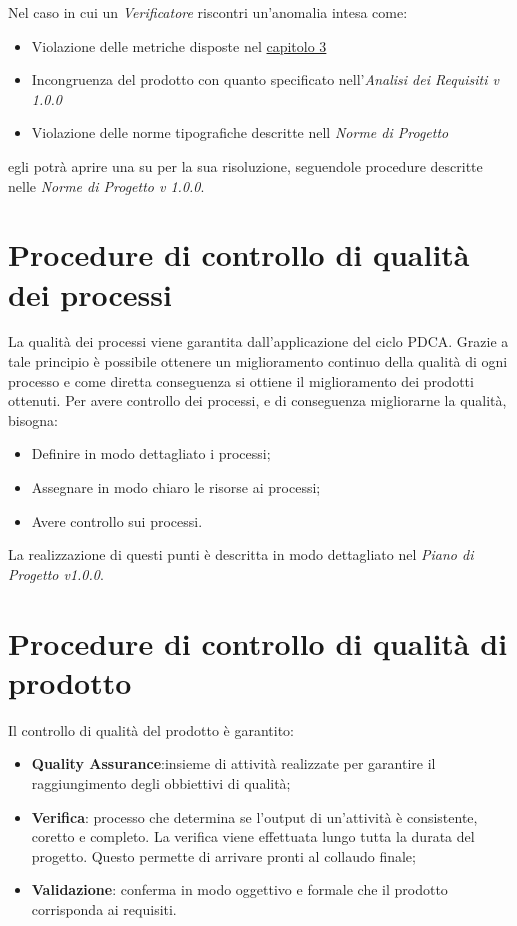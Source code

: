 Nel caso in cui un \textit{Verificatore} riscontri un'anomalia intesa come:

\begin{itemize}
	\item Violazione delle metriche disposte nel \hyperref[Metriche]{capitolo 3}
	\item Incongruenza del prodotto con quanto specificato nell'\textit{Analisi dei Requisiti v 1.0.0}
	\item Violazione delle norme tipografiche descritte nell \textit{Norme di Progetto}
\end{itemize}

egli potrà aprire una  su  per la sua risoluzione, seguendole procedure descritte nelle \textit{Norme di Progetto v 1.0.0}.
\section{Procedure di controllo di qualità dei processi}
La qualità dei processi viene garantita dall'applicazione del ciclo PDCA. Grazie a tale principio è possibile ottenere un miglioramento continuo della qualità di ogni processo e come diretta conseguenza si ottiene il miglioramento dei prodotti ottenuti.
Per avere controllo dei processi, e di conseguenza migliorarne la qualità, bisogna: 
\begin{itemize}
	\item Definire in modo dettagliato i processi;
	\item Assegnare in modo chiaro le risorse ai processi;
	\item Avere controllo sui processi.
\end{itemize} 
La realizzazione di questi punti è descritta in modo dettagliato nel \textit{Piano di Progetto v1.0.0}.
\section{Procedure di controllo di qualità di prodotto}
Il controllo di qualità del prodotto è garantito: 
\begin{itemize}
	\item \textbf{Quality Assurance}:insieme di attività realizzate per garantire il raggiungimento degli obbiettivi di qualità;
	\item \textbf{Verifica}: processo che determina se l'output di un'attività è consistente, coretto e completo. La verifica viene effettuata lungo tutta la durata del progetto. Questo permette di arrivare pronti al collaudo finale;
	\item \textbf{Validazione}: conferma in modo oggettivo e formale che il prodotto corrisponda ai requisiti.
\end{itemize}
  

